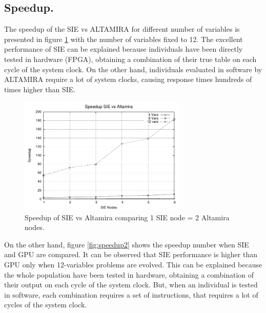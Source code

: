 \documentclass{sig-alternate}
\begin{document}
\subsection{Speedup.}
The speedup of the SIE vs ALTAMIRA for different number of variables is presented in figure \ref{fig:speedup1} with the number of variables fixed to 12. The excellent performance of SIE can be explained because individuals have been directly tested in hardware (FPGA), obtaining a combination of their true table on each cycle of the system clock. On the other hand, individuals evaluated in software by ALTAMIRA require a lot of system clocks, causing response times hundreds of times higher than SIE.                                                     





\begin{figure}[h!]
\begin{center} 
\includegraphics[width=8cm]{./images/speedup_sie_vs_altamira} 
\end{center}
\caption{Speedup of SIE vs Altamira comparing 1 SIE node = 2 Altamira nodes.}
\label{fig:speedup1}
\end{figure}

On the other hand, figure \ref{fig:speedup2} shows the speedup number when SIE and GPU are compared. It can be observed that SIE performance is higher than GPU only when 12-variables problems are evolved.  This can be explained because the whole population have been tested in hardware, obtaining a combination of their output on each cycle of the system clock. But, when an individual is tested in software, each combination requires a set of instructions, that requires a lot of cycles of the system clock.
\end{document}
